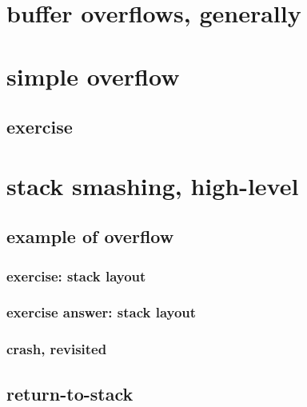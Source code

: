
\section{buffer overflows, generally}


\section{simple overflow}


\subsection{exercise}



\section{stack smashing, high-level}


\subsection{example of overflow}


\subsubsection{exercise: stack layout}


\subsubsection{exercise answer: stack layout}


\subsubsection{crash, revisited}


\subsection{return-to-stack}


